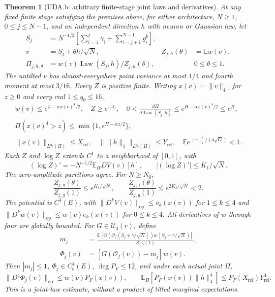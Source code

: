 \documentclass[11pt]{article}
\theoremstyle{plain}
\newtheorem{theorem}{Theorem}[section]
\theoremstyle{definition}
\theoremstyle{remark}
\newcommand{\E}{\mathbb{E}}
\DeclareMathOperator{\Law}{Law}
\begin{document}
\begin{theorem}[UDA.b: arbitrary finite-stage joint laws and derivatives]
\label{uda:clause-b}
At any fixed finite stage satisfying the premises above, for either
architecture, $N\ge1$, $0\le j\le N-1$, and an independent direction
$h$ with neuron or Gaussian law, let
\begin{align*}
 S_j&=N^{-1/2}\left[\sum_{i=1}^j\gamma_i+
                         \sum_{i=j+1}^{N-1}g_i^b\right],\\
 v&=S_j+\theta h/\sqrt N,&Z_{j,h}(\theta)&=\E w(v),\\
 \Pi_{j,h,\theta}&=w(v)\Law(S_j,h)/Z_{j,h}(\theta),&&0\le\theta\le1.
\end{align*}
The untilted $v$ has almost-everywhere point variance at most $1/4$ and
fourth moment at most $3/16$. Every $Z$ is positive finite. Writing
$x(v)=\|v\|_4$, for $z\ge0$ and every real $1\le q_0\le16$,
\begin{gather*}
 w(v)\le e^{L-\alpha x(v)^4/2},\quad Z\ge e^{-J_z},\quad
 0<\frac{d\Pi}{d\Law(S_j,h)}\le e^{H-\alpha x(v)^4/2}\le e^H,\\
 \Pi(x(v)^4>z)\le\min\{1,e^{H-\alpha z/2}\},\\
 \|x(v)\|_{L^{q_0}(\Pi)}\le X_{\mathrm{rel}},\quad
 \|\|h\|_4\|_{L^{q_0}(\Pi)}\le Y_{\mathrm{rel}},\quad
 \E e^{\|\gamma\|_4^2/(4\sqrt O)}<4.
\end{gather*}
Each $Z$ and $\log Z$ extends $C^1$ to a neighborhood of $[0,1]$, with
\[
 (\log Z)'=-N^{-1/2}\E_\Pi DV(v)[h],\qquad
 |(\log Z)'|\le K_1/\sqrt N.
\]
The zero-amplitude partitions agree. For $N\ge N_0$,
\[
 \frac{Z_{j,g}(\theta)}{Z_{j,g}(1)}\le e^{K_1/\sqrt N},\qquad
 \frac{Z_{j,\gamma}(\theta)}{Z_{j,g}(1)}\le e^{2K_1/\sqrt N}<2.
\]
The potential is $C^4(E)$, with
$\|D^kV(v)\|_{\mathrm{op}}\le v_k(x(v))$ for $1\le k\le4$ and
$\|D^kw(v)\|_{\mathrm{op}}\le w(v)e_k(x(v))$ for $0\le k\le4$.
All derivatives of $w$ through four are globally bounded. For
$G\in\mathcal U_4(r)$, define
\begin{align*}
 m_j&=\frac{\E[G(\mathcal O_f(S_j+\gamma/\sqrt N))
                       w(S_j+\gamma/\sqrt N)]}{Z_{j,\gamma}(1)},\\
 \Phi_j(v)&=[G(\mathcal O_f(v))-m_j]w(v).
\end{align*}
Then $|m_j|\le1$, $\Phi_j\in C_b^4(E)$, $\deg P_F\le12$, and under
each actual joint $\Pi$,
\[
 \|D^4\Phi_j(v)\|_{\mathrm{op}}\le w(v)P_F(x(v)),\qquad
 \E_\Pi[P_F(x(v))\|h\|_4^4]\le P_F(X_{\mathrm{rel}})Y_{\mathrm{rel}}^4.
\]
This is a joint-law estimate, without a product of tilted marginal expectations.
\end{theorem}
\end{document}
